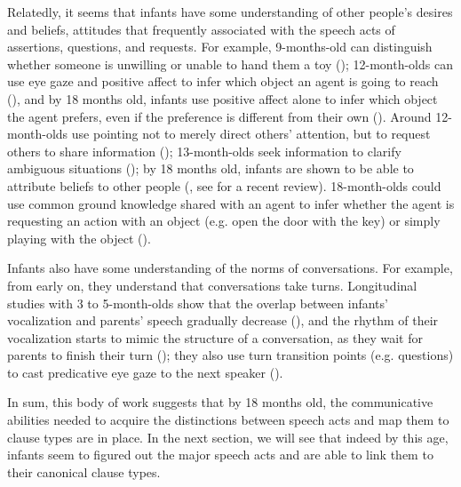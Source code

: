Relatedly, it seems that infants have some understanding of other people's desires and beliefs, attitudes that frequently associated with the speech acts of assertions, questions, and requests. For example, 9-months-old can distinguish whether someone is unwilling or unable to hand them a toy (\cite{behne2005goal}); 12-month-olds can use eye gaze and positive affect to infer which object an agent is going to reach (\cite{phillips2002gaze}), and by 18 months old, infants use positive affect alone to infer which object the agent prefers, even if the preference is different from their own (\cite{repacholi1997desire}). Around 12-month-olds use pointing not to merely direct others' attention, but to request others to share information (\cite{kovacs2014request}); 13-month-olds seek information to clarify ambiguous situations (\cite{vaish2011request}); by 18 months old, infants are shown to be able to attribute beliefs to other people (\cite{onishi2005tom,surian2007tom,song2008earlytom,song2008false, scott2009tom,perner2012earlytom}, see \cite{scott2017review} for a recent review). 18-month-olds could use common ground knowledge shared with an agent to infer whether the agent is requesting an action with an object (e.g. open the door with the key) or simply playing with the object (\cite{schulze2015indirect}).%
 


Infants also have some understanding of the norms of conversations. For example, from early on, they understand that conversations take turns. Longitudinal studies with 3 to 5-month-olds show that the overlap between infants' vocalization and parents' speech gradually decrease (\cite{hilbrink2013turn3mo}), and the rhythm of their vocalization starts to mimic the structure of a conversation, as they wait for parents to finish their turn (\cite{hilbrink2013turn,hilbrink2015,casillas2016corpus}); they also use turn transition points (e.g. questions) to cast predicative eye gaze to the next speaker (\cite{casillas2017turn}).

 
 
In sum, this body of work suggests that by 18 months old, the communicative abilities needed to acquire the distinctions between speech acts and map them to clause types are in place. In the next section, we will see that indeed by this age, infants seem to figured out the major speech acts and are able to link them to their canonical clause types.



